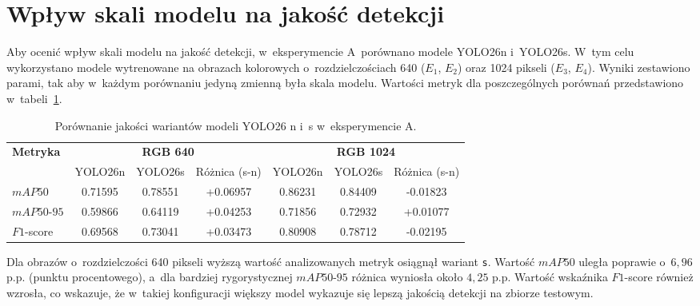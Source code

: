 \section{Wpływ skali modelu na jakość detekcji} %

Aby ocenić wpływ skali modelu na jakość detekcji, w~eksperymencie A~porównano modele YOLO26n i~YOLO26s. W~tym celu wykorzystano modele wytrenowane na obrazach kolorowych o~rozdzielczościach 640 ($E_1$, $E_2$) oraz 1024 pikseli ($E_3$, $E_4$). Wyniki zestawiono parami, tak aby w~każdym porównaniu jedyną zmienną była skala modelu. Wartości metryk dla poszczególnych porównań przedstawiono w~tabeli~\ref{tab:exp_a}.

\begin{table}[ht]
    \centering
    \caption{Porównanie jakości wariantów modeli YOLO26 n i~s w~eksperymencie A.}
    \label{tab:exp_a}
    \begin{tabular}{l|ccc|ccc}
        \toprule
        \multirow{2}{*}{\textbf{Metryka}}
         & \multicolumn{3}{c|}{\textbf{RGB 640}}
         & \multicolumn{3}{c}{\textbf{RGB 1024}}                           \\
        \cline{2-7}
         & YOLO26n                               & YOLO26s & Różnica (s-n)
         & YOLO26n                               & YOLO26s & Różnica (s-n) \\
        \midrule
        $mAP50$
         & 0.71595                               & 0.78551 & +0.06957
         & 0.86231                               & 0.84409 & -0.01823      \\

        $mAP50\text{-}95$
         & 0.59866                               & 0.64119 & +0.04253
         & 0.71856                               & 0.72932 & +0.01077      \\

        $F1$-score
         & 0.69568                               & 0.73041 & +0.03473
         & 0.80908                               & 0.78712 & -0.02195      \\
        \bottomrule
    \end{tabular}
\end{table}

Dla obrazów o~rozdzielczości 640 pikseli wyższą wartość analizowanych metryk osiągnął wariant \texttt{s}. Wartość $mAP50$ uległa poprawie o~$6,96$ p.p. (punktu procentowego), a~dla bardziej rygorystycznej $mAP50\text{-}95$ różnica wyniosła około $4,25$ p.p. Wartość wskaźnika $F1$-score również wzrosła, co wskazuje, że w~takiej konfiguracji większy model wykazuje się lepszą jakością detekcji na zbiorze testowym.

